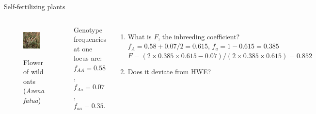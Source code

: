 \begin{frame}{Self-fertilizing plants}

	\begin{columns}


                \begin{figure}
                        \includegraphics[width=0.8\textwidth]{Pics/avena} \\
			\caption{Flower of wild oats (\textit{Avena fatua})}
                \end{figure}

		\small

                Genotype frequencies at one locus are: \\
		$f_{AA}=0.58$, $f_{Aa}=0.07$, $f_{aa}=0.35$.

		\begin{enumerate}
			\item What is $F$, the inbreeding coefficient?\\
			\pause
			$f_A=0.58 + 0.07/2=0.615$, $f_a=1-0.615=0.385$ \\
			$F = (2 \times 0.385 \times 0.615 - 0.07) / (2 \times 0.385 \times 0.615) = 0.852$
			\item Does it deviate from HWE?
		\end{enumerate}
		
        \end{columns}


\end{frame}


